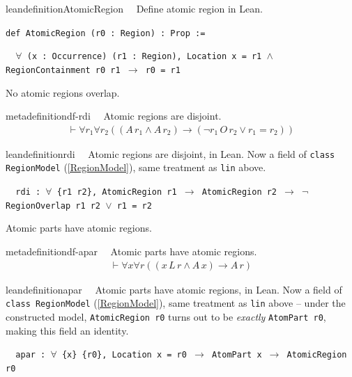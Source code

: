 \begin{restatable}{leandefinition}{AtomicRegion}~~ Define atomic region in Lean.

\texttt{\textcolor{leancolor}{def} \textcolor{leanyellow}{AtomicRegion} (r0 : Region) : Prop :=}

\texttt{~~$\forall$ (x : Occurrence) (r1 : Region), Location x = r1 $\wedge$ RegionContainment r0 r1 $\to$ r0 = r1}
\label{AtomicRegion}
\end{restatable}

\pn No atomic regions overlap.
\begin{restatable}{metadefinition}{df-rdi}~~ Atomic regions are disjoint.
\begin{align}
\vdash \forall r_1 \forall r_2 ( ( A \,r_1 \wedge A \,r_2 ) \rightarrow ( \lnot r_1
    \,O \,r_2 \vee r_1 = r_2 ) )\label{eq:df-rdi}\tag{df-rdi}
\end{align}
\end{restatable}

\begin{restatable}{leandefinition}{rdi}~~ Atomic regions are disjoint, in Lean. Now a field of
\texttt{class RegionModel} (\ref{RegionModel}), same treatment as \texttt{lin} above.

\texttt{~~rdi : $\forall$ \{r1 r2\}, AtomicRegion r1 $\to$ AtomicRegion r2 $\to$ $\lnot$ RegionOverlap r1 r2 $\vee$ r1 = r2}
\label{rdi}
\end{restatable}

\pn Atomic parts have atomic regions.
\begin{restatable}{metadefinition}{df-apar}~~ Atomic parts have atomic regions.
\begin{align}
\vdash \forall x \forall r ( ( x \,L \,r \wedge A \,x ) \rightarrow A \,r
    )\label{eq:df-apar}\tag{df-apar}
\end{align}
\end{restatable}

\begin{restatable}{leandefinition}{apar}~~ Atomic parts have atomic regions, in Lean. Now a
field of \texttt{class RegionModel} (\ref{RegionModel}), same treatment as \texttt{lin} above -- under the
constructed model, \texttt{AtomicRegion r0} turns out to be \emph{exactly} \texttt{AtomPart r0}, making this
field an identity.

\texttt{~~apar : $\forall$ \{x\} \{r0\}, Location x = r0 $\to$ AtomPart x $\to$ AtomicRegion r0}
\label{apar}
\end{restatable}

